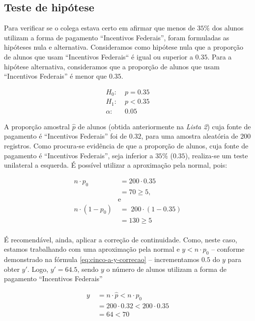 \subsection{Teste de hipótese}
\label{questao:3a}
Para verificar se o colega estava certo em afirmar que menos de $35\%$ dos alunos utilizam a forma de pagamento ``Incentivos Federais'', 
foram formuladas as hipóteses nula e alternativa.
Consideramos como hipótese nula que a proporção de alunos que usam ``Incentivos Federais`` é igual ou superior a $0.35$. 
Para a hipótese alternativa, consideramos que a proporção de alunos que usam ``Incentivos Federais'' é menor que $0.35$.

\begin{align*}
  H_0\!:   &\; p = 0.35 \\
  H_1\!:   &\; p < 0.35  \\
   \alpha\!:&\; 0.05
\end{align*}

A proporção amostral $\hat{p}$ de alunos (obtida anteriormente na \textit{Lista 2}) cuja fonte de pagamento
é ``Incentivos Federais'' foi de $0.32$, para uma amostra aleatória de $200$ registros.
Como procura-se evidência de que a proporção de alunos, cuja fonte de pagamento é ``Incentivos Federais'', 
seja inferior a $35\%$ ($0.35$), realiza-se um teste unilateral a esquerda. É possível utilizar a aproximação pela normal, pois:

\begin{align*}
  n \cdot p_0\!  &\; = 200 \cdot 0.35 \\
  &\; = 70 \geq 5 ,\\
  & \text{e} \\
  n \cdot (1 - p_0)\!	&\;=\; 200 \cdot (1 - 0.35) \\
  &\;= 130  \geq 5 \\
\end{align*}

É recomendável, ainda, aplicar a correção de continuidade. 
Como, neste caso, estamos trabalhando com uma aproximação pela normal e  
$y < n \cdot p_0$ – conforme demonstrado na fórmula \ref{eq:cinco-a-y-correcao} – 
incrementamos $0.5$ do $y$ para obter $y'$. Logo, $y' = 64.5$, sendo $y$ o número de alunos utilizam a forma de pagamento ``Incentivos Federais'' 

\begin{align}
  \label{eq:cinco-a-y-correcao}
  y   &\; =  n \cdot \hat{p} < n \cdot p_0 \\ 
      &\; = 200 \cdot 0.32 < 200 \cdot 0.35 \nonumber \\
      &\; = 64 < 70 \nonumber
\end{align}

